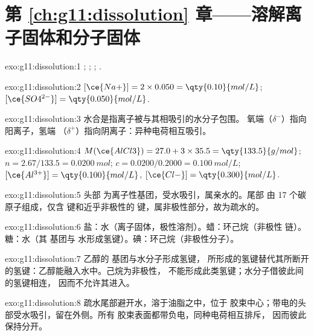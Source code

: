 \section*{第 \ref{ch:g11:dissolution} 章——溶解离子固体和分子固体}

\begin{solution}{exo:g11:dissolution:1}
;
;
;
.
\end{solution}

\begin{solution}{exo:g11:dissolution:2}
$[\ce{Na+}] = 2 \times 0.050 = \qty{0.10}{mol/L}$;
$[\ce{SO4^{2-}}] = \qty{0.050}{mol/L}$.
\end{solution}

\begin{solution}{exo:g11:dissolution:3}
水合是指离子被与其相吸引的水分子包围。
氧端（$\delta^-$）指向阳离子，氢端
（$\delta^+$）指向阴离子：异种电荷相互吸引。
\end{solution}

\begin{solution}{exo:g11:dissolution:4}
$M(\ce{AlCl3}) = 27.0 + 3 \times 35.5 = \qty{133.5}{g/mol}$;
$n = 2.67 / 133.5 = \qty{0.0200}{mol}$; $c = 0.0200 / 0.2000 =
\qty{0.100}{mol/L}$; $[\ce{Al^{3+}}] = \qty{0.100}{mol/L}$,
$[\ce{Cl-}] = \qty{0.300}{mol/L}$.
\end{solution}

\begin{solution}{exo:g11:dissolution:5}
头部  为离子性基团，受水吸引，属亲水的。尾部
由 17 个碳原子组成，仅含  键和近乎非极性的 
键，属非极性部分，故为疏水的。
\end{solution}

\begin{solution}{exo:g11:dissolution:6}
盐：水（离子固体，极性溶剂）。蜡：环己烷（非极性
链）。糖：水（其  基团与
水形成氢键）。碘：环己烷（非极性分子）。
\end{solution}

\begin{solution}{exo:g11:dissolution:7}
乙醇的  基团与水分子形成氢键，
所形成的氢键替代其所断开的氢键：乙醇能融入水中。己烷为非极性，
不能形成此类氢键；水分子借彼此间的氢键相连，
因而不允许其进入。
\end{solution}

\begin{solution}{exo:g11:dissolution:8}
疏水尾部避开水，溶于油脂之中，位于
胶束中心；带电的头部受水吸引，留在外侧。所有
胶束表面都带负电，同种电荷相互排斥，
因而彼此保持分开。
\end{solution}

